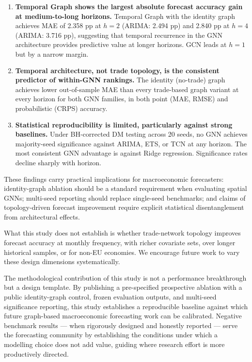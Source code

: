 \documentclass[
]{article}
\providecommand{\tightlist}{%
  \setlength{\itemsep}{0pt}\setlength{\parskip}{0pt}}
\begin{document}
\begin{enumerate}
\def\labelenumi{\arabic{enumi}.}
\tightlist
\item
  \textbf{Temporal Graph shows the largest absolute forecast accuracy gain at medium-to-long horizons.} Temporal Graph with the identity graph achieves MAE of 2.358 pp at $h = 2$ (ARIMA: 2.494 pp) and 2.840 pp at $h = 4$ (ARIMA: 3.716 pp), suggesting that temporal recurrence in the GNN architecture provides predictive value at longer horizons. GCN leads at $h = 1$ but by a narrow margin.
\item
  \textbf{Temporal architecture, not trade topology, is the consistent predictor of within-GNN rankings.} The identity (no-trade) graph achieves lower out-of-sample MAE than every trade-based graph variant at every horizon for both GNN families, in both point (MAE, RMSE) and probabilistic (CRPS) accuracy.
\item
  \textbf{Statistical reproducibility is limited, particularly against strong baselines.} Under BH-corrected DM testing across 20 seeds, no GNN achieves majority-seed significance against ARIMA, ETS, or TCN at any horizon. The most consistent GNN advantage is against Ridge regression. Significance rates decline sharply with horizon.
\end{enumerate}

These findings carry practical implications for macroeconomic forecasters: identity-graph ablation should be a standard requirement when evaluating spatial GNNs; multi-seed reporting should replace single-seed benchmarks; and claims of topology-driven forecast improvement require explicit statistical disentanglement from architectural effects.

What this study does not establish is whether trade-network topology improves forecast accuracy at monthly frequency, with richer covariate sets, over longer historical samples, or for non-EU economies. We encourage future work to vary these design dimensions systematically.

The methodological contribution of this study is not a performance breakthrough but a design template. By publishing a pre-specified prospective ablation with a public identity-graph control, frozen evaluation outputs, and multi-seed significance reporting, this study establishes a reproducible baseline against which future graph-based macroeconomic forecasting work can be calibrated. Negative benchmark results --- when rigorously designed and honestly reported --- serve the forecasting community by establishing the conditions under which a modelling choice does not add value, guiding where research effort is more productively directed.
\end{document}
